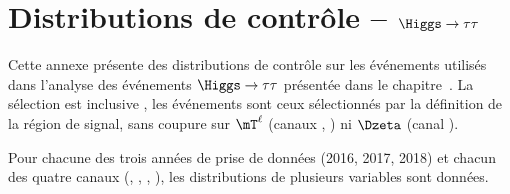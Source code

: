 \chapter{Distributions de contrôle -- $\Higgs\to\tau\tau$}\label{annexe-control_plots-HTT}

Cette annexe présente des distributions de contrôle
sur les événements utilisés dans l'analyse des événements $\Higgs\to\tau\tau$
présentée dans le chapitre~.
La sélection est \og inclusive \fg, les événements sont ceux sélectionnés par la définition de la région de signal,
sans coupure sur $\mT^{\ell}$ (canaux \mu\tauh, \ele\tauh) ni $\Dzeta$ (canal \ele\mu).
\par
Pour chacune des trois années de prise de données (2016, 2017, 2018)
et
chacun des quatre canaux (\tauh\tauh, \mu\tauh, \ele\tauh, \ele\mu),
les distributions de plusieurs variables sont données.

\def\EMBFFchoice{emb_ff}

